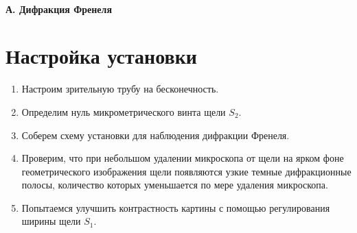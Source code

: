 \documentclass[14pt, a4paper]{report}
\begin{document}
\paragraph*{А. Дифракция Френеля}

\section{Настройка установки}

\begin{enumerate}

\item Настроим зрительную трубу на бесконечность.

\item Определим нуль микрометрического винта щели $S_2$.

\item Соберем схему установки для наблюдения дифракции Френеля.

\item Проверим, что при небольшом удалении микроскопа от щели на ярком фоне геометрического изображения щели появляются узкие темные дифракционные полосы, количество которых уменьшается по мере удаления микроскопа.

\item Попытаемся улучшить контрастность картины с помощью регулирования ширины щели $S_1$.

\end{enumerate}
\end{document}
